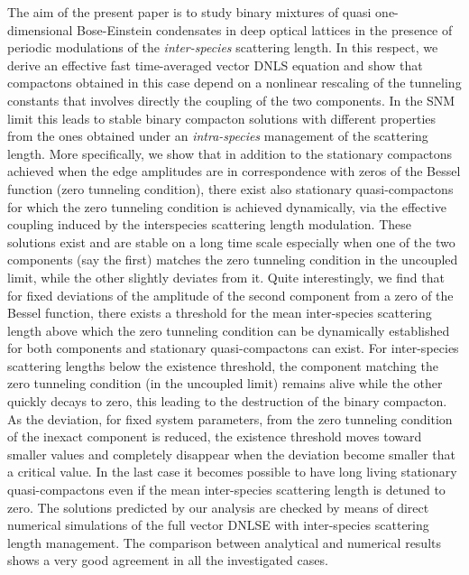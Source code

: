 \documentclass[12pt]{iopart}
\begin{document}
The aim of the present paper is to study binary mixtures of quasi
one-dimensional Bose-Einstein condensates in deep optical lattices
in the presence of periodic modulations of the \textit{inter-species}
scattering length. In this respect, we derive an effective fast time-averaged
vector DNLS equation and show that compactons obtained in this
case depend on a nonlinear rescaling of the tunneling constants that
involves directly the coupling of the two components. In the SNM limit
this leads to stable binary compacton solutions with different properties from the ones obtained
under an \textit{intra-species} management of the scattering length.
More specifically, we show that in addition to the stationary compactons
achieved when the edge amplitudes are in correspondence with zeros of the Bessel function (zero tunneling condition), there exist also stationary quasi-compactons for
which the zero tunneling condition is achieved dynamically, via the effective coupling induced by the interspecies
scattering length modulation. These solutions exist and are stable on a long time scale especially when one of the two components (say the first)  matches the zero tunneling condition in the uncoupled limit, while the other slightly deviates from it. Quite interestingly, we find that
for fixed deviations of the amplitude of the second component from a zero
of the Bessel function, there exists a threshold for the mean inter-species
scattering length above which the zero tunneling condition can be dynamically
established for both components and stationary quasi-compactons can exist.
For inter-species scattering lengths below the existence threshold, the component matching the zero tunneling condition (in the uncoupled limit) remains alive while the other  quickly decays to zero, this leading to the destruction of the binary compacton. As the deviation, for fixed system parameters, from the zero tunneling condition of the inexact component is reduced, the existence threshold moves toward smaller values and completely disappear when the deviation become smaller that a critical value. In the last case it becomes possible to have long living stationary quasi-compactons even if the mean inter-species scattering length is detuned to zero.
The solutions predicted by our analysis are checked by means of direct
numerical simulations of the full vector DNLSE with inter-species scattering
length management. The comparison between analytical and numerical
results shows a very good agreement in all the investigated cases.
\end{document}
